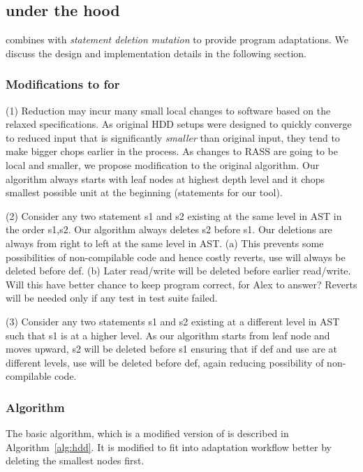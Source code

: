 \subsection{\mytool under the hood}
\label{sec:experiments}
\mytool combines \HDD with \emph{statement deletion mutation} to provide program
adaptations. We discuss the design and implementation details in the following
section.

\subsubsection{Modifications to \HDD for \RASS}
\label{sec:intutive}


(1)  Reduction may incur many small local changes to software based on the
relaxed specifications. As original HDD setups were designed to quickly converge
to reduced input that is significantly \emph{smaller} than original input, they
tend to make bigger chops earlier in the process. As changes to RASS are going
to be local and smaller, we propose modification to the original algorithm. Our
algorithm always starts with leaf nodes at highest depth level and it chops
smallest possible unit at the beginning (statements for our tool).


(2) Consider any two statement s1 and s2 existing at the same level in AST in
the order s1,s2. Our algorithm always deletes s2 before s1. Our deletions are
always from right to left at the same level in AST. (a) This prevents some
possibilities of non-compilable code and hence costly reverts, use will always
be deleted before def. (b) Later read/write will be deleted before earlier
read/write. Will this have better chance to keep program correct, for Alex to
answer? Reverts will be needed only if any test in test suite failed.


(3) Consider any two statements s1 and s2 existing at a different level in AST
such that s1 is at a higher level. As our algorithm starts from leaf node and
moves upward, s2 will be deleted before s1 ensuring that if def and use are at
different levels, use will be deleted before def, again reducing possibility of
non-compilable code.

\subsubsection{Algorithm}
\label{sec:algorithm}
The basic algorithm, which is a modified version of \HDD is described
in Algorithm~\ref{alg:hdd}.
It is modified to fit into adaptation workflow better by deleting the smallest
nodes first.

